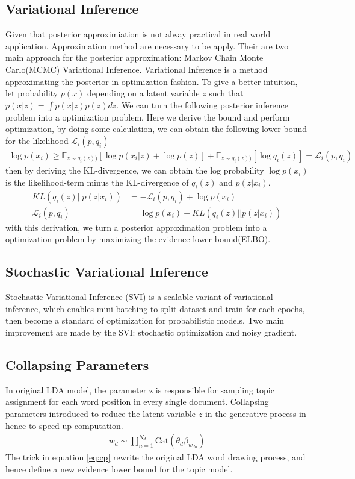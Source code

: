 \subsection{Variational Inference}
Given that posterior approximiation is not alway practical in real world application. Approximation method are necessary to be apply. Their are two main approach for the posterior approximation: Markov Chain Monte Carlo(MCMC) Variational Inference. Variational Inference is a method approximating the posterior in optimization fashion. To give a better intuition, let probability $ p(x) $ depending on a latent variable $ z $ such that $ p(x|z)=\int p(x|z)p(z)dz $. We can turn the following posterior inference problem into a optimization problem. Here we derive the bound and perform optimization, by doing some calculation, we can obtain the following lower bound for the likelihood $ \mathcal{L}_i(p,q_i) $
\begin{align}
\log p(x_i)\geq\mathbb{E}_{z\sim q_i(z))}[\log p(x_i|z)+\log p(z)]+\mathbb{E}_{z\sim q_i(z))}[\log q_i(z)]=\mathcal{L}_i(p,q_i)
\end{align}
then by deriving the KL-divergence, we can obtain the log probability $ \log p(x_i) $ is the likelihood-term minus the KL-divergence of $ q_i(z) $ and $ p(z|x_i) $.
\begin{align}
KL(q_i(z)||p(z|x_i))&=-\mathcal{L}_i(p,q_i)+\log p(x_i)\\
\mathcal{L}_i(p,q_i)&=\log p(x_i)-KL(q_i(z)||p(z|x_i))
\end{align}
with this derivation, we turn a posterior approximation problem into a optimization problem by maximizing the evidence lower bound(ELBO).
\subsection{Stochastic Variational Inference}
Stochastic Variational Inference (SVI)\cite{hoffman_stochastic_2013} is a scalable variant of variational inference, which enables mini-batching to split dataset and train for each epochs, then become a standard of optimization for probabilistic models.
Two main improvement are made by the SVI: stochastic optimization and noisy gradient.
\subsection{Collapsing Parameters}
In original LDA model, the parameter z is responsible for sampling topic assignment for each word position in every single document. Collapsing parameters\cite{srivastava_autoencoding_2017} introduced to reduce the latent variable $ z $ in the generative process in hence to speed up computation.
\begin{align}\label{eq:cp}
w_d\sim\prod_{n=1}^{N_d}\text{Cat}(\theta_d\beta_{w_{dn}})
\end{align}
The trick in equation \ref{eq:cp} rewrite the original LDA word drawing process, and hence define a new evidence lower bound for the topic model.
